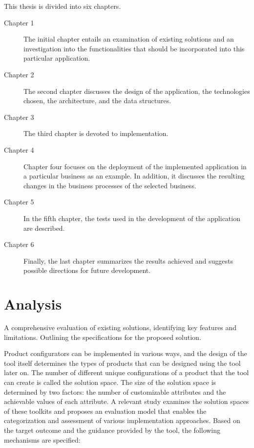 This thesis is divided into six chapters.

\begin{description}
\item[Chapter 1] The initial chapter entails an examination of existing solutions and an investigation into the functionalities that should be incorporated into this particular application.

\item[Chapter 2] The second chapter discusses the design of the application, the technologies chosen, the architecture, and the data structures.

\item[Chapter 3] The third chapter is devoted to implementation.

\item[Chapter 4] Chapter four focuses on the deployment of the implemented application in a particular business as an example. In addition, it discusses the resulting changes in the business processes of the selected business.

\item[Chapter 5] In the fifth chapter, the tests used in the development of the application are described.

\item[Chapter 6] Finally, the last chapter summarizes the results achieved and suggests possible directions for future development.
\end{description}






\chapter{Analysis}

\begin{chapterabstract}
A comprehensive evaluation of existing solutions, identifying key features and limitations. Outlining the specifications for the proposed solution.
\end{chapterabstract}

Product configurators can be implemented in various ways, and the design of the tool itself determines the types of products that can be designed using the tool later on. The number of different unique configurations of a product that the tool can create is called the solution space. The size of the solution space is determined by two factors: the number of customizable attributes and the achievable values of each attribute. \cite{Huiwen2018} A relevant study examines the solution spaces of these toolkits and proposes an evaluation model that enables the categorization and assessment of various implementation approaches. Based on the target outcome and the guidance provided by the tool, the following mechanisms are specified: \cite{Hermans2012}

